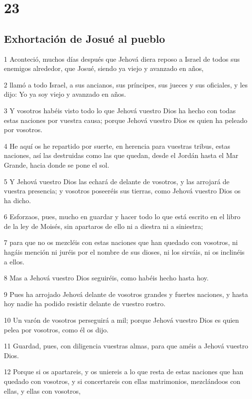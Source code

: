 \chapter{23}

\section*{Exhortación de Josué al pueblo}

\par 1 Aconteció, muchos días después que Jehová diera reposo a Israel de todos sus enemigos alrededor, que Josué, siendo ya viejo y avanzado en años,
\par 2 llamó a todo Israel, a sus ancianos, sus príncipes, sus jueces y sus oficiales, y les dijo: Yo ya soy viejo y avanzado en años.
\par 3 Y vosotros habéis visto todo lo que Jehová vuestro Dios ha hecho con todas estas naciones por vuestra causa; porque Jehová vuestro Dios es quien ha peleado por vosotros.
\par 4 He aquí os he repartido por suerte, en herencia para vuestras tribus, estas naciones, así las destruidas como las que quedan, desde el Jordán hasta el Mar Grande, hacia donde se pone el sol.
\par 5 Y Jehová vuestro Dios las echará de delante de vosotros, y las arrojará de vuestra presencia; y vosotros poseeréis sus tierras, como Jehová vuestro Dios os ha dicho.
\par 6 Esforzaos, pues, mucho en guardar y hacer todo lo que está escrito en el libro de la ley de Moisés, sin apartaros de ello ni a diestra ni a siniestra;
\par 7 para que no os mezcléis con estas naciones que han quedado con vosotros, ni hagáis mención ni juréis por el nombre de sus dioses, ni los sirváis, ni os inclinéis a ellos.
\par 8 Mas a Jehová vuestro Dios seguiréis, como habéis hecho hasta hoy.
\par 9 Pues ha arrojado Jehová delante de vosotros grandes y fuertes naciones, y hasta hoy nadie ha podido resistir delante de vuestro rostro.
\par 10 Un varón de vosotros perseguirá a mil; porque Jehová vuestro Dios es quien pelea por vosotros, como él os dijo. 
\par 11 Guardad, pues, con diligencia vuestras almas, para que améis a Jehová vuestro Dios.
\par 12 Porque si os apartareis, y os uniereis a lo que resta de estas naciones que han quedado con vosotros, y si concertareis con ellas matrimonios, mezclándoos con ellas, y ellas con vosotros,
